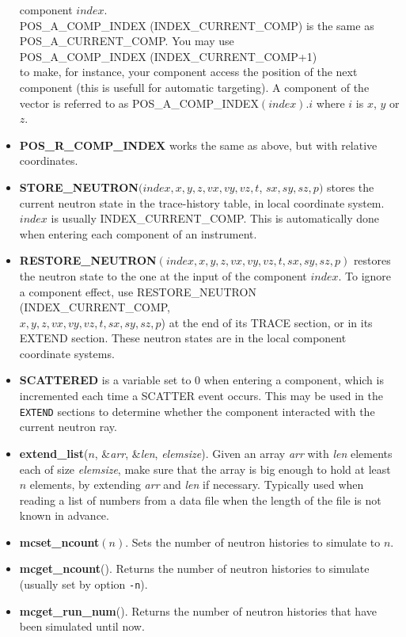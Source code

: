 \begin{itemize}
  component $index$. \\
  POS\_A\_COMP\_INDEX (INDEX\_CURRENT\_COMP) is the same as \\
  POS\_A\_CURRENT\_COMP. You may use \\
  POS\_A\_COMP\_INDEX  (INDEX\_CURRENT\_COMP+1) \\
  to make, for instance, your
  component access the position of the next component (this is usefull for
  automatic targeting).  A component of the vector is referred to as
  POS\_A\_COMP\_INDEX$(index).i$ where $i$ is $x$, $y$ or $z$.
\item {\bf POS\_R\_COMP\_INDEX} works the same as above,
  but with relative coordinates.
\item {\bf STORE\_NEUTRON}$(index, x, y, z, vx, vy, vz, t$, $sx, sy,
sz, p)$ stores the current neutron state in the trace-history table,
in local coordinate system. $index$ is usually INDEX\_CURRENT\_COMP.
This is automatically done when entering each component of an
instrument.
\item {\bf RESTORE\_NEUTRON}$(index, x, y, z, vx, vy, vz, t, sx, sy,
sz, p)$ restores the neutron state to the one at the input of the
component $index$. To ignore a component effect, use
RESTORE\_NEUTRON (INDEX\_CURRENT\_COMP, \\
$x, y, z, vx, vy, vz, t,
sx, sy, sz, p$) at the end of its TRACE section, or in its EXTEND
section. These neutron states are in the local component coordinate
systems.
\item {\bf SCATTERED} is a variable set to 0 when entering
  a component, which is incremented each time a SCATTER event occurs.
  This may be used in the \verb+EXTEND+ sections to determine whether
  the component interacted with the current neutron ray.
\item {\bf extend\_list}($n$, \&\textit{arr}, \&\textit{len},
  \textit{elemsize}). Given an array \textit{arr} with \textit{len}
  elements each of size \textit{elemsize}, make sure that the array is
  big enough to hold at least $n$ elements, by extending \textit{arr}
  and \textit{len} if necessary. Typically used when reading a list of
  numbers from a data file when the length of the file is not known in advance.
\item {\bf mcset\_ncount}$(n)$. Sets the number of neutron histories to simulate to $n$.
\item {\bf mcget\_ncount}(). Returns the number of neutron histories to simulate (usually set by option \verb+-n+).
\item {\bf mcget\_run\_num}(). Returns the number of neutron histories that have been simulated until now.
\end{itemize}

